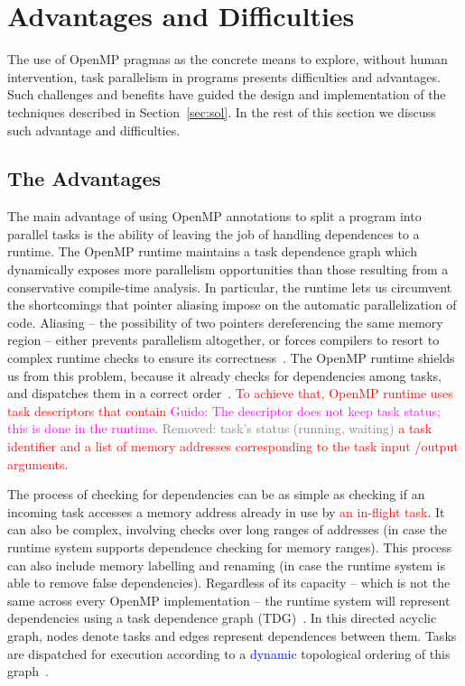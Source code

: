 \documentclass[sigplan,10pt,review,anonymous]{acmart}
\newcommand{\guido}[1]{\noindent\textcolor{magenta}{Guido: {#1}}}
\newcommand{\rmv}[1]{\noindent\textcolor{gray}{Removed: {#1}}}
\newcommand{\new}[1]{\noindent\textcolor{blue}{ {#1}}}
\newcommand{\ed}[1]{\noindent\textcolor{red}{ {#1}}}
\newcommand{\guido}[1]{}
\newcommand{\rmv}[1]{}
\newcommand{\new}[1]{#1}
\newcommand{\ed}[1]{}
\begin{document}
\section{Advantages and Difficulties}
\label{sec:ovf}

The use of OpenMP pragmas as the concrete means to explore, without human
intervention, task parallelism in programs presents difficulties and
advantages. 
Such challenges and benefits have guided the design and implementation of the
techniques described in Section~\ref{sec:sol}.
In the rest of this section we discuss such advantage and difficulties.

\subsection{The Advantages}
\label{sub:adv}

The main advantage of using OpenMP annotations to split a program into parallel
tasks is
the ability  of leaving the job of  handling dependences to a runtime.
The OpenMP runtime maintains a task dependence graph which dynamically exposes more parallelism 
opportunities than those resulting from a conservative  compile-time  analysis.
In particular, the runtime lets us circumvent the shortcomings that pointer aliasing
impose on the automatic parallelization of code.
Aliasing -- the possibility of two pointers dereferencing the same
memory region -- either prevents parallelism altogether, or forces compilers to
resort to complex runtime checks to ensure its correctness~\cite{Alves15,Rus02}.
The OpenMP runtime shields us from this problem, because
it already checks for dependencies among tasks, and dispatches them in a
correct order~\cite{LaGrone11}. \ed{To achieve that, OpenMP runtime uses task descriptors that contain}
\guido{The descriptor does not keep task status; this is done in the runtime.}
\rmv{task's status (running, waiting)} \ed{a task identifier and  a list of memory addresses corresponding to the task input /output arguments.}

The process of checking for dependencies can be as simple as checking if an
incoming task accesses a memory address already in use by \ed{an in-flight task}.
It can also be complex, involving checks over long ranges of addresses
(in case the runtime system supports dependence checking for memory ranges).
This process can also include memory labelling and renaming (in case the
runtime system is able to remove false dependencies).
Regardless of its capacity -- which is not the same across every OpenMP
implementation -- the runtime system will represent dependencies using a task
dependence graph (TDG)~\cite{Duran08}.
In this directed acyclic graph, nodes denote tasks and edges represent
dependences between them.
Tasks are dispatched for execution according to a \new{dynamic} topological ordering of this
graph~\cite{Planas15}.
\end{document}
